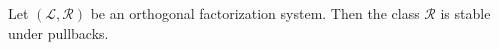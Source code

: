 \begin{comment}
\begin{thm}
From every orthogonal factorization system we obtain a reflective subcategory with the same modal types.
\end{thm}

\begin{proof}
We define $P(A)$ to be the proposition that the unique map $A\to\unit$ is in
$\mathcal{R}$.
For any type $A$, there is a unique factorization
\begin{equation*}
\begin{tikzcd}
A \arrow[r,"{\modalunit[A]}"] & \modal A \arrow[r] & \unit
\end{tikzcd}
\end{equation*}
of the unique map $A\to\unit$, where $\modalunit[A]$ is in $\mathcal{L}$. This
defines the operation $\modal$ and the modal units.

Now let $A:\UU$ and $B:\UU_P$, and consider $f:A\to B$. We have to show that
the type of extensions of $f$ along $\modalunit$ is contractible.
It is immediate that the type of such extensions is equivalent to the type
$\mathsf{fill}_{\mathcal{L},\mathcal{R}}(f,g)$ of diagonal fillers
of the square
\begin{equation*}
\begin{tikzcd}
A \arrow[r,"f"] \arrow[d,swap,"{\modalunit[A]}"] & B \arrow[d] \\
\modal A \arrow[r,swap,"g"] & \unit
\end{tikzcd}
\end{equation*}
By \autoref{lem:diagonal_fillers}, the assumption that $P(B)$ holds and the fact that $\modalunit[A]$ is
in $\mathcal{L}$, we know that this type of diagonal fillers is contractible.
\end{proof}
\end{comment}

\begin{lem}\label{lem:ofs_rightstable}
Let $(\mathcal{L},\mathcal{R})$ be an orthogonal factorization system. Then
the class $\mathcal{R}$ is stable under pullbacks.
\end{lem}


